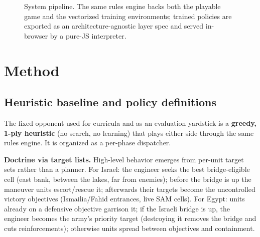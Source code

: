 \documentclass{article}
\begin{document}
\begin{figure}[t]
\centering
{}
\caption{System pipeline. The same rules engine backs both the playable game and the
vectorized training environments; trained policies are exported as an
architecture-agnostic layer spec and served in-browser by a pure-JS interpreter.}
\label{fig:system}
\end{figure}

\section{Method}

\subsection{Heuristic baseline and policy definitions}
\label{sec:heur}
The fixed opponent used for curricula and as an evaluation yardstick is a
\textbf{greedy, 1-ply heuristic} (no search, no learning) that plays either side
through the same rules engine. It is organized as a per-phase dispatcher.

\textbf{Doctrine via target lists.} High-level behavior emerges from per-unit target
sets rather than a planner. For Israel: the engineer seeks the best bridge-eligible
cell (east bank, between the lakes, far from enemies); before the bridge is up the
maneuver units escort/rescue it; afterwards their targets become the uncontrolled
victory objectives (Ismailia/Fahid entrances, live SAM cells). For Egypt: units already
on a defensive objective garrison it; if the Israeli bridge is up, the engineer becomes
the army's priority target (destroying it removes the bridge and cuts reinforcements);
otherwise units spread between objectives and containment.
\end{document}
